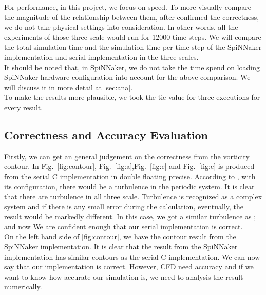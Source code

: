 For performance, in this project, we focus on speed. To more visually compare the magnitude of the relationship between them, after confirmed the correctness, we do not take physical settings into consideration. In other words, all the experiments of those three scale would run for 12000 time steps. We will compare the total simulation time and the simulation time per time step of the SpiNNaker implementation and serial implementation in the three scales. \\

It should be noted that, in SpiNNaker, we do not take the time spend on loading SpiNNaker hardware configuration into account for the above comparison. We will discuss it in more detail at \ref{sec:ana}.\\

To make the results more plausible, we took the tie value for three executions for every result.\\
\subsection{Correctness and Accuracy Evaluation} \label{sec:caae}
Firstly, we can get an general judgement on the correctness from the vorticity contour. In Fig.~\ref{fig:contour}, Fig.~\ref{fig:a},Fig.~\ref{fig:c} and Fig.~\ref{fig:e} is produced from the serial C implementation in double floating precise. According to \cite{minion1997performance}, with its configuration, there would be a turbulence in the periodic system. It is clear that there are turbulence in all three scale. Turbulence is recognized as a complex system and if there is any small error during the calculation, eventually, the result would be markedly different. In this case, we got a similar turbulence as \cite{minion1997performance}; and now We are confident enough that our serial implementation is correct.\\

On the left hand side of \ref{fig:contour}, we have the contour result from the SpiNNaker implementation. It is clear that the result from the SpiNNaker implementation has similar contours as the serial C implementation. We can now say that our implementation is correct. However, CFD need accuracy and if we want to know how accurate our simulation is, we need to analysis the result numerically.\\

